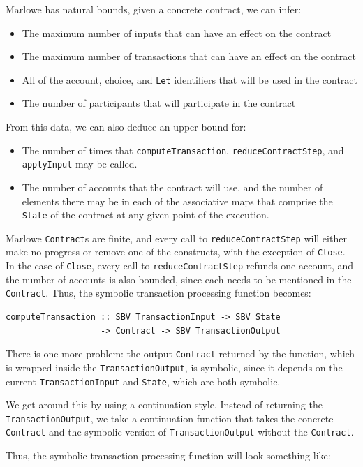 \documentclass[english,runningheads]{llncs}
\begin{document}
Marlowe has natural bounds, given a concrete contract, we can infer:
\begin{itemize}
\item The maximum number of inputs that can have an effect on the contract
\item The maximum number of transactions that can have an effect on the
contract
\item All of the account, choice, and \texttt{Let} identifiers that will
be used in the contract
\item The number of participants that will participate in the contract
\end{itemize}
From this data, we can also deduce an upper bound for:
\begin{itemize}
\item The number of times that
\texttt{computeTransaction}, \texttt{reduceContractStep}, and \texttt{applyInput} may
be called.
\item The number of accounts that the contract will use, and
the number of elements there may be in each of the associative maps
that comprise the \texttt{State} of the contract at any given point
of the execution.
\end{itemize}
Marlowe \texttt{Contract}s are finite, and every call to
\texttt{reduceContractStep} will either make no progress or
remove one of the constructs, with the exception of \texttt{Close}.
In the case of \texttt{Close}, every call to \texttt{reduceContractStep} refunds
one account, and the number of accounts is also bounded, since each
needs to be mentioned in the \texttt{Contract}. Thus, the symbolic transaction
processing function becomes:

\begin{verbatim}
computeTransaction :: SBV TransactionInput -> SBV State
                   -> Contract -> SBV TransactionOutput
\end{verbatim}

There is one more problem: the output \texttt{Contract} returned
by the function, which is wrapped inside the \texttt{TransactionOutput},
is symbolic, since it depends on the current \texttt{TransactionInput}
and \texttt{State}, which are both symbolic.

We get around this by using a continuation style. Instead
of returning the \texttt{TransactionOutput}, we take a continuation
function that takes the concrete \texttt{Contract} and the symbolic version
of \texttt{TransactionOutput} without the \texttt{Contract}.

Thus, the symbolic transaction processing function will look something
like:
\end{document}
